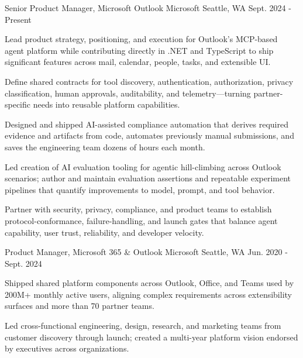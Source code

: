 

\begin{cventries}

  \cventry
    {Senior Product Manager, Microsoft Outlook} %
    {Microsoft} %
    {} %
    {Seattle, WA} %
    {Sept. 2024 - Present} %
    {
      \begin{cvitems} %
        \item {Lead product strategy, positioning, and execution for Outlook's MCP-based agent platform while contributing directly in .NET and TypeScript to ship significant features across mail, calendar, people, tasks, and extensible UI.}
        \item {Define shared contracts for tool discovery, authentication, authorization, privacy classification, human approvals, auditability, and telemetry---turning partner-specific needs into reusable platform capabilities.}
        \item {Designed and shipped AI-assisted compliance automation that derives required evidence and artifacts from code, automates previously manual submissions, and saves the engineering team dozens of hours each month.}
        \item {Led creation of AI evaluation tooling for agentic hill-climbing across Outlook scenarios; author and maintain evaluation assertions and repeatable experiment pipelines that quantify improvements to model, prompt, and tool behavior.}
        \item {Partner with security, privacy, compliance, and product teams to establish protocol-conformance, failure-handling, and launch gates that balance agent capability, user trust, reliability, and developer velocity.}
      \end{cvitems}
    }

  \cventry
    {Product Manager, Microsoft 365 \& Outlook} %
    {Microsoft} %
    {} %
    {Seattle, WA} %
    {Jun. 2020 - Sept. 2024} %
    {
      \begin{cvitems} %
        \item {Shipped shared platform components across Outlook, Office, and Teams used by 200M+ monthly active users, aligning complex requirements across extensibility surfaces and more than 70 partner teams.}
        \item {Led cross-functional engineering, design, research, and marketing teams from customer discovery through launch; created a multi-year platform vision endorsed by executives across organizations.}
      \end{cvitems}
    }


\end{cventries}
